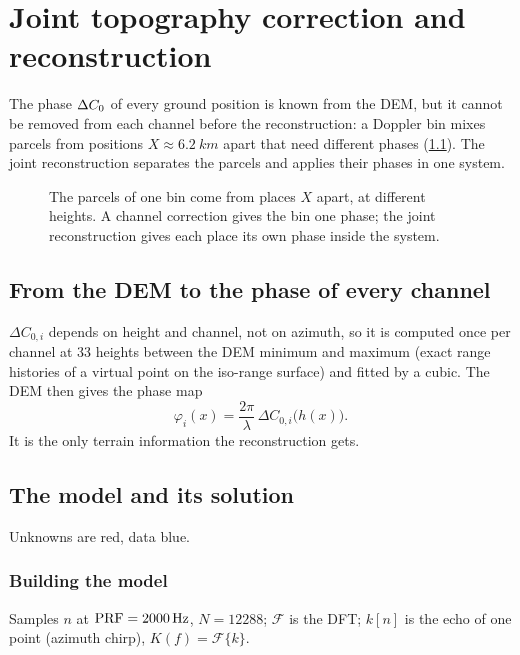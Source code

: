 \chapter{Joint topography correction and reconstruction}\label{ch:joint}

The phase ${\Delta C_0}$ of every ground position is known from the DEM, but it cannot be removed from each channel before the
reconstruction: a Doppler bin mixes parcels from positions $X\approx\SI{6.2}{km}$ apart that need different phases
(\cref{fig:binconflict}). The joint reconstruction separates the parcels and applies their phases in one system.

\begin{figure}[htbp]
\centering

\caption[The conflict of one bin]{The parcels of one bin come from places $X$ apart, at different heights. A channel
correction gives the bin one phase; the joint reconstruction gives each place its own phase inside the system.}
\label{fig:binconflict}
\end{figure}

\section{From the DEM to the phase of every channel}\label{sec:dem-phase}

$\Delta C_{0,i}$ depends on height and channel, not on azimuth, so it is computed once per channel at 33 heights between the
DEM minimum and maximum (exact range histories of a virtual point on the iso-range surface) and fitted by a cubic. The DEM
then gives the phase map
\begin{equation}
  \varphi_i(x)=\frac{2\pi}{\lambda}\,\Delta C_{0,i}\bigl(h(x)\bigr).
  \label{eq:phasemap}
\end{equation}
It is the only terrain information the reconstruction gets.

\section{The model and its solution}\label{sec:joint-system}

Unknowns are red, data blue.

\subsection{Building the model}\label{sec:joint-build}

\noindent Samples $n$ at $\mathrm{PRF}=\SI{2000}{Hz}$, $N=12288$; $\mathcal F$ is the DFT; $k[n]$ is the echo of one point (azimuth
chirp), $K(f)=\mathcal F\{k\}$.

